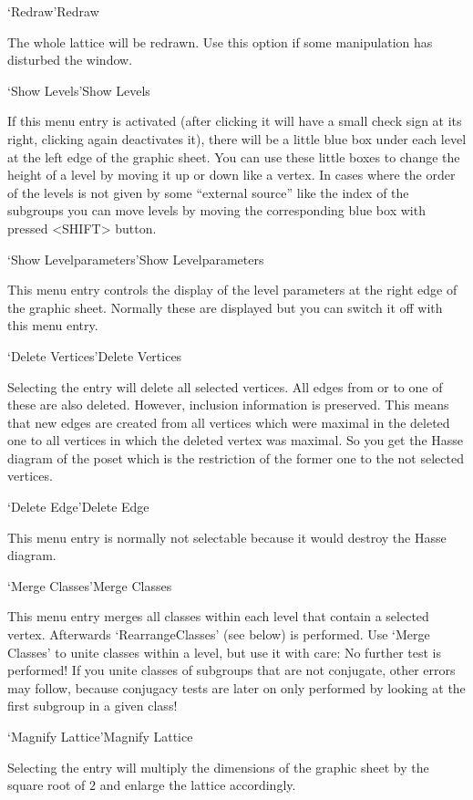 \>`Redraw'{Redraw}

  The whole lattice will be redrawn. Use this option if some manipulation
  has disturbed the window.
  
\>`Show Levels'{Show Levels}

  If this menu entry is activated (after clicking it will have a small
  check sign at its right, clicking again deactivates it), there will be a
  little blue box under each level at the left edge of the graphic
  sheet. You can use these little boxes to change the height of a level by
  moving it up or down like a vertex. In cases where the order of the
  levels is not given by some ``external source'' like the index of the
  subgroups you can move levels by moving the corresponding blue box with
  pressed <SHIFT> button.
  
\>`Show Levelparameters'{Show Levelparameters}

  This menu entry controls the display of the level parameters at the right 
  edge of the graphic sheet. Normally these are displayed but you can
  switch it off with this menu entry.

\>`Delete Vertices'{Delete Vertices}

  Selecting the entry will delete all selected vertices. All edges from or
  to one of these are also deleted. However, inclusion information is
  preserved. This means that new edges are created from all vertices which
  were maximal in the deleted one to all vertices in which the deleted
  vertex was maximal. So you get the Hasse diagram of the poset which is
  the restriction of the former one to the not selected vertices.

\>`Delete Edge'{Delete Edge}

  This menu entry is normally not selectable because it would destroy the
  Hasse diagram.
  
\>`Merge Classes'{Merge Classes}

This menu  entry merges all  classes within each  level that contain a
selected  vertex.    Afterwards  `RearrangeClasses'  (see   below)  is
performed.  Use `Merge Classes' to  unite classes within a level,  but
use it  with care: No further test  is performed! If you unite classes
of subgroups that are not conjugate, other  errors may follow, because
conjugacy tests  are later on only  performed by  looking at the first
subgroup in a given class!

\>`Magnify Lattice'{Magnify Lattice}

  Selecting the entry will multiply the dimensions of the graphic sheet by
  the square root of $2$ and enlarge the lattice accordingly.

